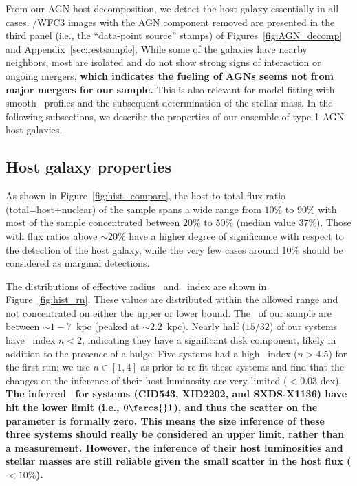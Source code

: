 \documentclass[apj]{emulateapj}
\begin{document}
From our AGN-host decomposition, we detect the host galaxy essentially in all cases. \hst/WFC3 images with the AGN component removed are presented in the third panel (i.e., the ``data-point source'' stamps) of Figures~\ref{fig:AGN_decomp} and Appendix~\ref{sec:restsample}. While some of the galaxies have nearby neighbors, most are isolated and do not show strong signs of interaction or ongoing mergers, {\bf which indicates the fueling of AGNs seems not from major mergers for our sample.} This is also relevant for model fitting with smooth \sersic\ profiles and the subsequent determination of the stellar mass. In the following subsections, we describe the properties of our ensemble of type-1 AGN host galaxies.
 
\subsection{Host galaxy properties}
\label{sec:result-hosts}
As shown in Figure~\ref{fig:hist_compare}, the host-to-total flux ratio (total=host+nuclear) of the sample spans a wide range from $10\%$ to $90\%$ with most of the sample concentrated between $20\%$ to $50\%$ (median value $37\%$). Those with flux ratios above $\sim20\%$ have a higher degree of significance with respect to the detection of the host galaxy, while the very few cases around 10\% should be considered as marginal detections. 

The distributions of effective radius \Reff\ and \sersic\ index are shown in Figure~\ref{fig:hist_rn}. These values are distributed within the allowed range and not concentrated on either the upper or lower bound. The \Reff\ of our sample are between $\sim1-7$~kpc (peaked at $\sim2.2$~kpc). Nearly half ($15/32$) of our systems have \sersic\ index $n<2$, indicating they have a significant disk component, likely in addition to the presence of a bulge. Five systems had a high \sersic\ index ($n>4.5$) for the first run; we use $n\in[1,4]$ as prior to re-fit these systems and find that the changes on the inference of their host luminosity are very limited ($<0.03$ dex). {\bf The inferred \Reff\ for systems (CID543, XID2202, and SXDS-X1136) have hit the lower limit (i.e., $0\farcs{}1$), and thus the scatter on the parameter is formally zero. This means the size inference of these three systems should really be considered an upper limit, rather than a measurement. However, the inference of their host luminosities and stellar masses are still reliable given the small scatter in the host flux ($<10\%$).}
\end{document}
